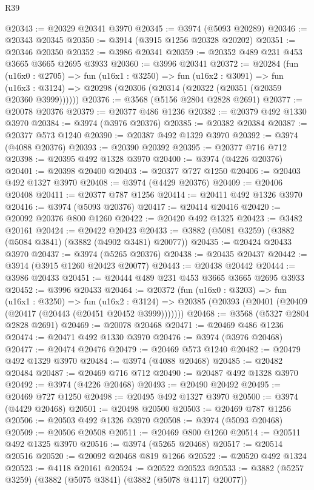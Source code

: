 \begin{lexlean}{R39}
\begin{coremodule}
@20343 := @20329 @20341 @3970
@20345 := @3974 (@5093 @20289)
@20346 := @20343 @20345
@20350 := @3914 (@3915 @1256 @20328 @20202)
@20351 := @20346 @20350
@20352 := @3986 @20341
@20359 := @20352 @489 @231 @453 @3665 @3665 @2695 @3933
@20360 := @3996 @20341
@20372 := @20284
    (fun (u16x0 : @2705) =>
    fun (u16x1 : @3250) =>
    fun (u16x2 : @3091) =>
    fun (u16x3 : @3124) => @20298 (@20306 (@20314 (@20322 (@20351 (@20359 @20360 @3999))))))
@20376 := @3568 (@5156 @2804 @2828 @2691)
@20377 := @20078 @20376
@20379 := @20377 @486 @1236
@20382 := @20379 @492 @1330 @3970
@20384 := @3974 (@3976 @20376)
@20385 := @20382 @20384
@20387 := @20377 @573 @1240
@20390 := @20387 @492 @1329 @3970
@20392 := @3974 (@4088 @20376)
@20393 := @20390 @20392
@20395 := @20377 @716 @712
@20398 := @20395 @492 @1328 @3970
@20400 := @3974 (@4226 @20376)
@20401 := @20398 @20400
@20403 := @20377 @727 @1250
@20406 := @20403 @492 @1327 @3970
@20408 := @3974 (@4429 @20376)
@20409 := @20406 @20408
@20411 := @20377 @787 @1256
@20414 := @20411 @492 @1326 @3970
@20416 := @3974 (@5093 @20376)
@20417 := @20414 @20416
@20420 := @20092 @20376 @800 @1260
@20422 := @20420 @492 @1325
@20423 := @3482 @20161
@20424 := @20422 @20423
@20433 := @3882 (@5081 @3259) (@3882 (@5084 @3841) (@3882 (@4902 @3481) @20077))
@20435 := @20424 @20433 @3970
@20437 := @3974 (@5265 @20376)
@20438 := @20435 @20437
@20442 := @3914 (@3915 @1260 @20423 @20077)
@20443 := @20438 @20442
@20444 := @3986 @20433
@20451 := @20444 @489 @231 @453 @3665 @3665 @2695 @3933
@20452 := @3996 @20433
@20464 := @20372
    (fun (u16x0 : @3203) =>
    fun (u16x1 : @3250) =>
    fun (u16x2 : @3124) =>
    @20385 (@20393 (@20401 (@20409 (@20417 (@20443 (@20451 @20452 @3999)))))))
@20468 := @3568 (@5327 @2804 @2828 @2691)
@20469 := @20078 @20468
@20471 := @20469 @486 @1236
@20474 := @20471 @492 @1330 @3970
@20476 := @3974 (@3976 @20468)
@20477 := @20474 @20476
@20479 := @20469 @573 @1240
@20482 := @20479 @492 @1329 @3970
@20484 := @3974 (@4088 @20468)
@20485 := @20482 @20484
@20487 := @20469 @716 @712
@20490 := @20487 @492 @1328 @3970
@20492 := @3974 (@4226 @20468)
@20493 := @20490 @20492
@20495 := @20469 @727 @1250
@20498 := @20495 @492 @1327 @3970
@20500 := @3974 (@4429 @20468)
@20501 := @20498 @20500
@20503 := @20469 @787 @1256
@20506 := @20503 @492 @1326 @3970
@20508 := @3974 (@5093 @20468)
@20509 := @20506 @20508
@20511 := @20469 @800 @1260
@20514 := @20511 @492 @1325 @3970
@20516 := @3974 (@5265 @20468)
@20517 := @20514 @20516
@20520 := @20092 @20468 @819 @1266
@20522 := @20520 @492 @1324
@20523 := @4118 @20161
@20524 := @20522 @20523
@20533 := @3882 (@5257 @3259) (@3882 (@5075 @3841) (@3882 (@5078 @4117) @20077))

\end{coremodule}
\end{lexlean}
